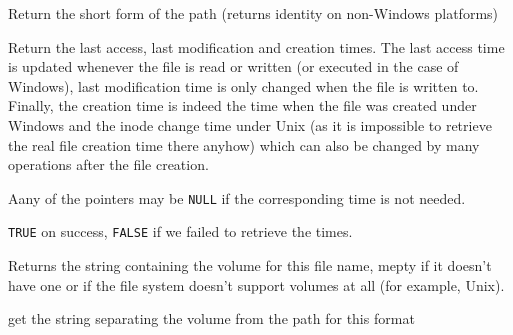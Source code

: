 \label{wxfilenamegetshortpath}


Return the short form of the path (returns identity on non-Windows platforms)


\label{wxfilenamegettimes}


Return the last access, last modification and creation times. The last access
time is updated whenever the file is read or written (or executed in the case
of Windows), last modification time is only changed when the file is written
to. Finally, the creation time is indeed the time when the file was created
under Windows and the inode change time under Unix (as it is impossible to
retrieve the real file creation time there anyhow) which can also be changed
by many operations after the file creation.

Aany of the pointers may be {\tt NULL} if the corresponding time is not
needed.


{\tt TRUE} on success, {\tt FALSE} if we failed to retrieve the times.

\label{wxfilenamegetvolume}


Returns the string containing the volume for this file name, mepty if it
doesn't have one or if the file system doesn't support volumes at all (for
example, Unix).

\label{wxfilenamegetvolumeseparator}


get the string separating the volume from the path for this format


\label{wxfilenamehasext}



\label{wxfilenamehasname}



\label{wxfilenamehasvolume}

